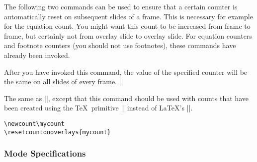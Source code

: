 
The following two commands can be used to ensure that a certain
counter is automatically reset on subsequent slides of a frame. This
is necessary for example for the equation count. You might want this
count to be increased from frame to frame, but certainly not from
overlay slide to overlay slide. For equation counters and footnote
counters (you should not use footnotes), these commands have already
been invoked.

\begin{command}{\resetcounteronoverlays{}}
  After you have invoked this command, the value of the specified
  counter will be the same on all slides of every frame.
  \example ||
\end{command}

\begin{command}{\resetcountonoverlays{}}
  The same as |\resetcounteronoverlays|, except that this
  command should be used with counts that have been created using the
  \TeX\ primitive |\newcount| instead of \LaTeX's  ||.
  \example
\begin{verbatim}
\newcount\mycount
\resetcountonoverlays{mycount}
\end{verbatim}
\end{command}






\subsubsection{Mode Specifications}

